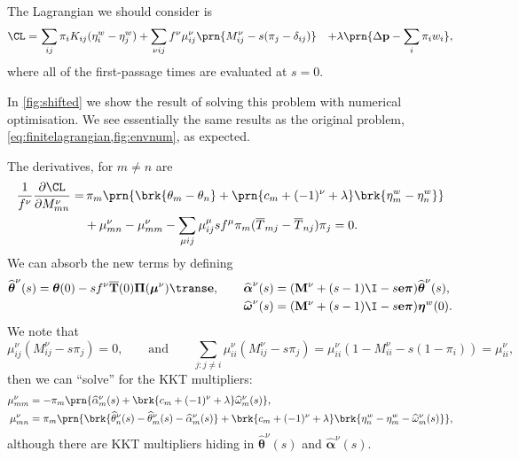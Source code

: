 \documentclass[12pt]{article}
\newcommand{\onev}{\mathbf{e}}
\newcommand{\prm}{p}
\newcommand{\pr}{\mathbf{\prm}}
\newcommand{\eqm}{\pi}
\newcommand{\eq}{\boldsymbol{\eqm}}
\newcommand{\Eqm}{\Pi}
\newcommand{\Eq}{\boldsymbol{\Eqm}}
\newcommand{\fptm}{T}
\newcommand{\fpt}{\mathbf{\fptm}}
\newcommand{\fptbm}{\overline{\fptm}}
\newcommand{\fptb}{\overline{\fpt}}
\newcommand{\etwm}{\eta^w}
\newcommand{\etw}{\boldsymbol{\eta}^w}
\newcommand{\thbm}{\theta}
\newcommand{\thb}{\boldsymbol{\thbm}}
\newcommand{\ombm}{\omega}
\newcommand{\omb}{\boldsymbol{\ombm}}
\newcommand{\albm}{\alpha}
\newcommand{\alb}{\boldsymbol{\albm}}
\newcommand{\wm}{w}
\newcommand{\MMdm}{M}
\newcommand{\MMd}{\mathbf{\MMdm}}
\newcommand{\encm}{K}
\renewcommand{\pdiff}[2]{\frac{\partial #1}{\partial #2}}
\newcommand{\shift}[1]{\widehat{#1}}
\begin{document}
The Lagrangian we should consider is
%
\begin{equation}\label{eq:lshiftlagrangian}
\begin{aligned}
  \CL =&\, \sum_{ij} \eqm_i \encm_{ij} (\etwm_i - \etwm_j)
        +\sum_{\nu i j}  f^\nu \mu^\nu_{ij}\prn{\MMdm^\nu_{ij} -  s (\eqm_j - \delta_{ij}) }
        &+ \lambda \prn{ \Delta\pr - \sum_i \eqm_i \wm_i },
\end{aligned}
\end{equation}
%
where all of the first-passage times are evaluated at \(s = 0\).

In \cref{fig:shifted} we show the result of solving this problem with numerical optimisation.
We see essentially the same results as the original problem, \cref{eq:finitelagrangian,fig:envnum}, as expected.

The derivatives, for \(m \neq n\) are
%
\begin{equation}\label{eq:lshiftderivs}
\begin{aligned}
  \frac{1}{f^\nu} \pdiff{\CL}{\MMdm^\nu_{mn}} = & \,
    \eqm_m \prn{ \brk{\thbm_m - \thbm_n}
     + \prn{{c}_m + (-1)^\nu + \lambda} \brk{\etwm_m - \etwm_n} } \\
     &+ \mu^\nu_{mn} -  \mu^\nu_{mm}
     - \sum_{\mu ij} \mu^\mu_{ij} s f^\mu \eqm_m (\fptbm_{mj} - \fptbm_{nj}) \eqm_j
    = 0.
\end{aligned}
\end{equation}
%
We can absorb the new terms by defining
%
\begin{equation*}
\begin{aligned}
  \shift{\thb}^\nu(s) = \thb(0) - s f^\nu \fptb(0) \Eq (\boldsymbol{\mu}^\nu)\trans \onev,
  \qquad
  \shift{\alb}^\nu(s) &= (\MMd^\nu + (s - 1) \I - s \onev \eq) \shift{\thb}^\nu(s),
  \\
  \shift{\omb}^\nu(s) &= (\MMd^\nu + (s - 1) \I - s \onev \eq) \etw(0).
\end{aligned}
\end{equation*}
%
We note that
%
\begin{equation*}
  \mu^\nu_{ij} (\MMdm^\nu_{ij} - s \eqm_j) = 0,
  \qquad \text{and} \qquad
  \sum_{j: j \neq i} \mu^\nu_{ii} (\MMdm^\nu_{ij} - s \eqm_j)
      = \mu^\nu_{ii} (1 - \MMdm^\nu_{ii} - s (1 - \eqm_i)) = \mu^\nu_{ii},
\end{equation*}
%
then we can ``solve'' for the KKT multipliers:
%
\begin{equation}\label{eq:lshiftsol}
\begin{aligned}
  \mu^\nu_{mm} &= - \eqm_m \prn{ \shift{\albm}^\nu_m(s) 
    + \brk{ {c}_m + (-1)^\nu + \lambda } \shift{\ombm}^\nu_m(s)
    }, \\
  \mu^\nu_{mn} &= \eqm_m \prn{ 
      \brk{ \shift{\thbm}^\nu_n(s) - \shift{\thbm}^\nu_m(s) - \shift{\albm}^\nu_m(s) }
    + \brk{ {c}_m + (-1)^\nu + \lambda } 
        \brk{ \etwm_n - \etwm_m - \shift{\ombm}^\nu_m(s) }
     }, \\
\end{aligned}
\end{equation}
%
although there are KKT multipliers hiding in \(\shift{\thb}^\nu(s)\) and \(\shift{\alb}^\nu(s)\).
\end{document}
